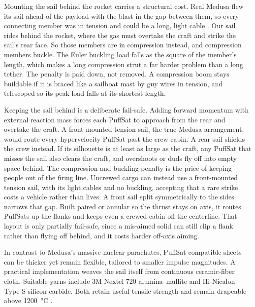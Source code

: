 \documentclass{article}
\begin{document}
Mounting the sail behind the rocket carries a structural cost. Real Medusa flew its sail ahead of the payload with the blast in the gap between them, so every connecting member was in tension and could be a long, light cable \cite{solem_medusa}. Our sail rides behind the rocket, where the gas must overtake the craft and strike the sail's rear face. So those members are in compression instead, and compression members buckle. The Euler buckling load falls as the square of the member's length, which makes a long compression strut a far harder problem than a long tether. The penalty is paid down, not removed. A compression boom stays buildable if it is braced like a sailboat mast by guy wires in tension, and telescoped so its peak load falls at its shortest length.

Keeping the sail behind is a deliberate fail-safe. Adding forward momentum with external reaction mass forces each PuffSat to approach from the rear and overtake the craft. A front-mounted tension sail, the true-Medusa arrangement, would route every hypervelocity PuffSat past the crew cabin. A rear sail shields the crew instead. If its silhouette is at least as large as the craft, any PuffSat that misses the sail also clears the craft, and overshoots or duds fly off into empty space behind. The compression and buckling penalty is the price of keeping people out of the firing line. Uncrewed cargo can instead use a front-mounted tension sail, with its light cables and no buckling, accepting that a rare strike costs a vehicle rather than lives. A front sail split symmetrically to the sides narrows that gap. Built paired or annular so the thrust stays on axis, it routes PuffSats up the flanks and keeps even a crewed cabin off the centerline. That layout is only partially fail-safe, since a mis-aimed solid can still clip a flank rather than flying off behind, and it costs harder off-axis aiming.

In contrast to Medusa's massive nuclear parachutes, PuffSat-compatible sheets can be thicker yet remain flexible, tailored to smaller impulse magnitudes. A practical implementation weaves the sail itself from continuous ceramic-fiber cloth. Suitable yarns include 3M Nextel 720 alumina--mullite \cite{nextel_720_fiber} and Hi-Nicalon Type S silicon carbide. Both retain useful tensile strength and remain drapeable above \SI{1200}{\celsius} \cite{nextel_720_hot_tensile, hi_nicalon_sic}.
\end{document}
